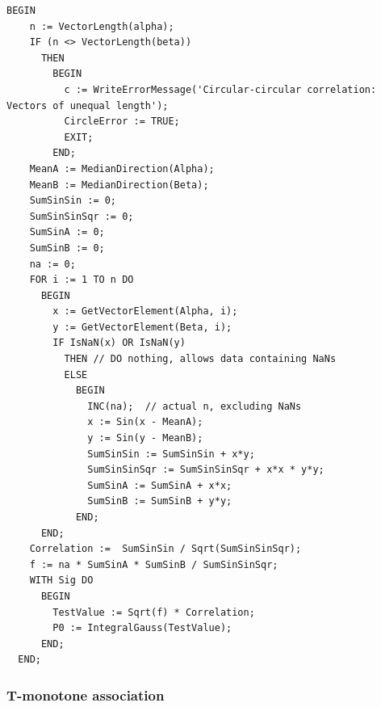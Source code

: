 \begin{refsection}
\begin{lstlisting}[caption=Correlation between linear and circular data]
  BEGIN
    n := VectorLength(alpha);
    IF (n <> VectorLength(beta))
      THEN
        BEGIN
          c := WriteErrorMessage('Circular-circular correlation: Vectors of unequal length');
          CircleError := TRUE;
          EXIT;
        END;
    MeanA := MedianDirection(Alpha);
    MeanB := MedianDirection(Beta);
    SumSinSin := 0;
    SumSinSinSqr := 0;
    SumSinA := 0;
    SumSinB := 0;
    na := 0;
    FOR i := 1 TO n DO
      BEGIN
        x := GetVectorElement(Alpha, i);
        y := GetVectorElement(Beta, i);
        IF IsNaN(x) OR IsNaN(y)
          THEN // DO nothing, allows data containing NaNs
          ELSE
            BEGIN
              INC(na);  // actual n, excluding NaNs
              x := Sin(x - MeanA);
              y := Sin(y - MeanB);
              SumSinSin := SumSinSin + x*y;
              SumSinSinSqr := SumSinSinSqr + x*x * y*y;
              SumSinA := SumSinA + x*x;
              SumSinB := SumSinB + y*y;
            END;
      END;
    Correlation :=  SumSinSin / Sqrt(SumSinSinSqr);
    f := na * SumSinA * SumSinB / SumSinSinSqr;
    WITH Sig DO
      BEGIN
        TestValue := Sqrt(f) * Correlation;
        P0 := IntegralGauss(TestValue);
      END;
  END;
\end{lstlisting}

\subsubsection{T-monotone association}


\end{refsection}
